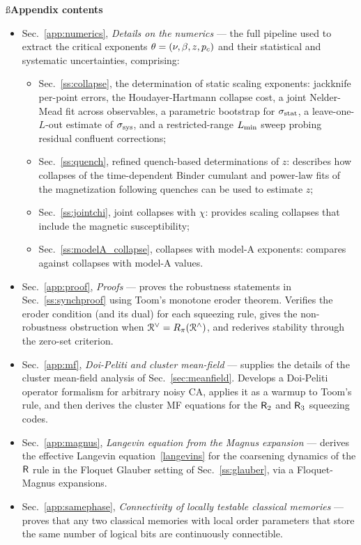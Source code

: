 \documentclass[pra,aps,twocolumn,groupedaddress,superscriptaddress,nofootinbib,preprintnumbers]{revtex4-2}
\begin{document}
	\begin{widetext}

		\ss*{{\bf Appendix contents}}

		\begin{itemize}
			\setlength\itemsep{3pt}
			\item Sec.~\ref{app:numerics}, \emph{Details on the numerics} --- the full pipeline used to extract the critical exponents $\theta = (\nu,\beta,z,p_c)$ and their statistical and systematic uncertainties, comprising:
			\begin{itemize}
				\setlength\itemsep{1pt}
				\item Sec.~\ref{ss:collapse}, the determination of static scaling exponents: jackknife per-point errors, the Houdayer-Hartmann collapse cost, a joint Nelder-Mead fit across observables, a parametric bootstrap for $\sigma_{\rm stat}$, a leave-one-$L$-out estimate of $\sigma_{\rm sys}$, and a restricted-range $L_{\rm min}$ sweep probing residual confluent corrections;
				\item Sec.~\ref{ss:quench}, refined quench-based determinations of $z$: describes how collapses of the time-dependent Binder cumulant and power-law fits of the magnetization following quenches can be used to estimate $z$;
				\item Sec.~\ref{ss:jointchi}, joint collapses with $\chi$: provides scaling collapses that include the magnetic susceptibility;
				\item Sec.~\ref{ss:modelA_collapse}, collapses with model-A exponents: compares against collapses with model-A values.
			\end{itemize}
			\item Sec.~\ref{app:proof}, \emph{Proofs} --- proves the robustness statements in Sec.~\ref{ss:synchproof} using Toom's monotone eroder theorem. Verifies the eroder condition (and its dual) for each squeezing rule, gives the non-robustness obstruction when $\mathcal{R}^\vee = R_\pi(\mathcal{R}^\wedge)$, and rederives stability through the zero-set criterion.
			\item Sec.~\ref{app:mf}, \emph{Doi-Peliti and cluster mean-field} --- supplies the details of the cluster mean-field analysis of Sec.~\ref{sec:meanfield}. Develops a Doi-Peliti operator formalism for arbitrary noisy CA, applies it as a warmup to Toom's rule, and then derives the cluster MF equations for the $\mathsf{R}_2$ and $\mathsf{R}_3$ squeezing codes.
			\item Sec.~\ref{app:magnus}, \emph{Langevin equation from the Magnus expansion} --- derives the effective Langevin equation~\eqref{langevins} for the coarsening dynamics of the $\mathsf{R}$ rule in the Floquet Glauber setting of Sec.~\ref{ss:glauber}, via a Floquet-Magnus expansions.
			\item Sec.~\ref{app:samephase}, \emph{Connectivity of locally testable classical memories} --- proves that any two  classical memories with local order parameters that store the same number of logical bits are continuously connectible.
		\end{itemize}


\end{widetext}
\end{document}
